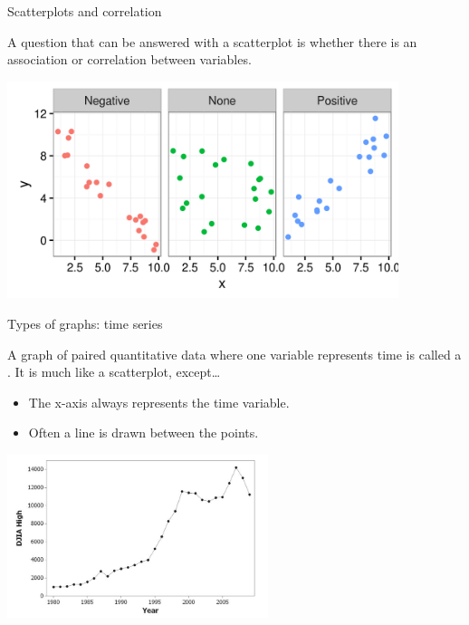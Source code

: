 \documentclass[]{beamer}
\begin{document}
\begin{frame}{Scatterplots and correlation}
\begin{block}{}
\large
A question that can be answered with a scatterplot is whether there is an association or correlation between variables.  
\end{block}
\includegraphics[width=4.5in]{../images/ch02_scatter_cor}
\end{frame}

\begin{frame}{Types of graphs: time series}
\begin{block}{}
A graph of paired quantitative data where one variable represents time is called a . It is much like a scatterplot, except\ldots
\begin{itemize}
\item The x-axis always represents the time variable.
\item Often a line is drawn between the points.
\end{itemize}
\end{block}
\bigskip
{\centering
\includegraphics[width=3in]{../images/ch02_timeseries}
\par}

\end{frame}
\end{document}
